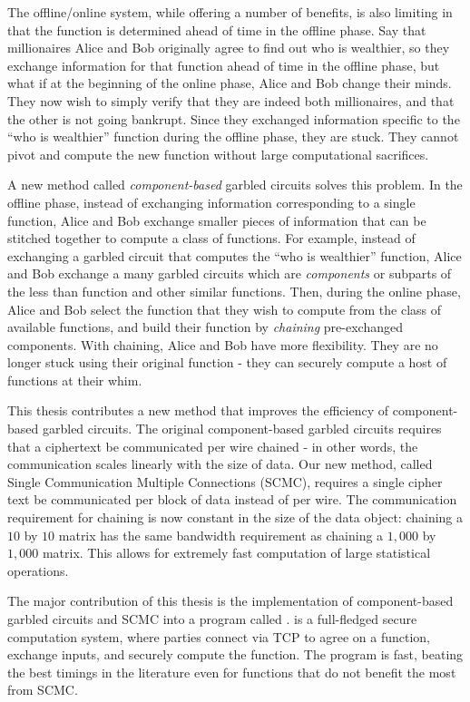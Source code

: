 The offline/online system, while offering a number of benefits, is also limiting in that the function is determined ahead of time in the offline phase.
Say that millionaires Alice and Bob originally agree to find out who is wealthier, so they exchange information for that function ahead of time in the offline phase, but what if at the beginning of the online phase, Alice and Bob change their minds. 
They now wish to simply verify that they are indeed both millionaires, and that the other is not going bankrupt.
Since they exchanged information specific to the ``who is wealthier'' function during the offline phase, they are stuck. 
They cannot pivot and compute the new function without large computational sacrifices.

A new method called \textit{component-based} garbled circuits solves this problem.
In the offline phase, instead of exchanging information corresponding to a single function, Alice and Bob exchange smaller pieces of information that can be stitched together to compute a class of functions.
For example, instead of exchanging a garbled circuit that computes the ``who is wealthier'' function, Alice and Bob exchange a many garbled circuits which are \textit{components} or subparts of the less than function and other similar functions.
Then, during the online phase, Alice and Bob select the function that they wish to compute from the class of available functions, and build their function by \textit{chaining} pre-exchanged components.
With chaining, Alice and Bob have more flexibility. 
They are no longer stuck using their original function - they can securely compute a host of functions at their whim. 

This thesis contributes a new method that improves the efficiency of component-based garbled circuits. 
The original component-based garbled circuits requires that a ciphertext be communicated per wire chained - in other words, the communication scales linearly with the size of data.
Our new method, called Single Communication Multiple Connections (SCMC), requires a single cipher text be communicated per block of data instead of per wire. 
The communication requirement for chaining is now constant in the size of the data object: chaining a $10$ by $10$ matrix has the same bandwidth requirement as chaining a $1,000$ by $1,000$ matrix. 
This allows for extremely fast computation of large statistical operations. 

The major contribution of this thesis is the implementation of component-based garbled circuits and SCMC into a program called \CompGC. 
\CompGC is a full-fledged secure computation system, where parties connect via TCP to agree on a function, exchange inputs, and securely compute the function.
The program is fast, beating the best timings in the literature even for functions that do not benefit the most from SCMC.


